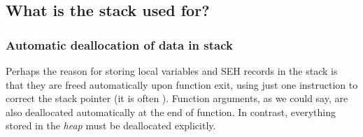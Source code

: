 \subsection{What is the stack used for?}



\EN{}
\RU{}
\PTBR{}




\subsubsection{Automatic deallocation of data in stack}

Perhaps the reason for storing local variables and SEH records in the stack is that they are freed automatically upon function exit,
using just one instruction to correct the stack pointer (it is often \ADD).
Function arguments, as we could say, are also deallocated automatically at the end of function.
In contrast, everything stored in the \emph{heap} must be deallocated explicitly.

\EN{}
\RU{}
\PTBR{}


